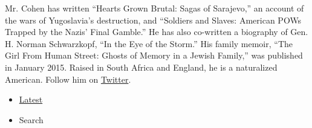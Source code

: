 Mr. Cohen has written ``Hearts Grown Brutal: Sagas of Sarajevo,'' an
account of the wars of Yugoslavia's destruction, and ``Soldiers and
Slaves: American POWs Trapped by the Nazis' Final Gamble.'' He has also
co-written a biography of Gen. H. Norman Schwarzkopf, ``In the Eye of
the Storm.'' His family memoir, ``The Girl From Human Street: Ghosts of
Memory in a Jewish Family,'' was published in January 2015. Raised in
South Africa and England, he is a naturalized American. Follow him on
\href{https://twitter.com/nytimescohen}{Twitter}.

\begin{itemize}
\tightlist
\item
  \protect\hyperlink{stream-panel}{Latest}
\item
  Search
\end{itemize}

